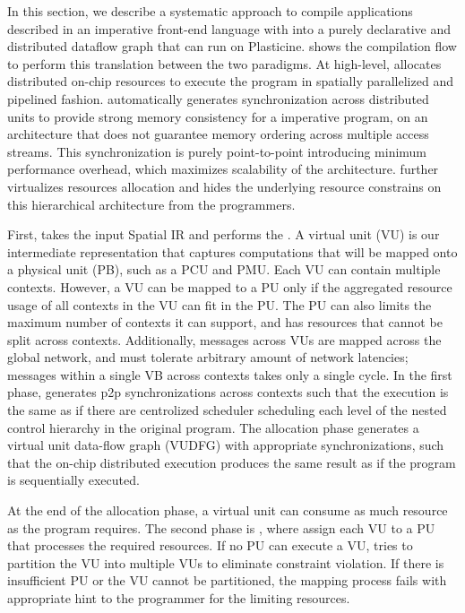 In this section, we describe a systematic approach to compile applications described in an
imperative front-end language with into a purely declarative and distributed dataflow graph that can
run on Plasticine.
 shows the compilation flow to perform this translation between the two paradigms.
At high-level, \name allocates distributed on-chip resources to execute the program in spatially parallelized and
pipelined fashion.
\name automatically generates synchronization across distributed units to provide strong 
memory consistency for a imperative program, on an architecture that does not guarantee memory
ordering across multiple access streams.
This synchronization is purely point-to-point introducing minimum performance overhead, which
maximizes scalability of the architecture.
\name further virtualizes resources allocation and hides the underlying resource constrains on
this hierarchical architecture from the programmers.

First, \name takes the input Spatial IR and performs the .
A virtual unit (VU) is our intermediate representation that captures computations that will be
mapped onto a physical unit (PB), such as a PCU and PMU.
Each VU can contain multiple contexts. However, a VU can be mapped to a PU only if the aggregated
resource usage of all contexts in the VU can fit in the PU. The PU can also limits the maximum 
number of contexts it can support, and has resources that cannot be split across contexts.
Additionally, messages across VUs are mapped across the global network, and must tolerate arbitrary 
amount of network latencies; messages within a single VB across contexts takes only a single cycle.
In the first phase, \name generates p2p synchronizations across contexts such that 
the execution is the same as if there are centrolized scheduler scheduling each level of the 
nested control hierarchy in the original program.
The allocation phase generates a virtual unit data-flow graph (VUDFG) with appropriate
synchronizations, such that the on-chip distributed execution produces the same result as if the program is
sequentially executed.

At the end of the allocation phase, a virtual unit can consume as much resource as the program
requires. The second phase is , where \name assign each VU to a
PU that processes the required resources. If no PU can execute a VU, \name tries to partition the
VU into multiple VUs to eliminate constraint violation. If there is insufficient PU or the
VU cannot be partitioned, the mapping process fails with appropriate hint to the programmer for the
limiting resources.

